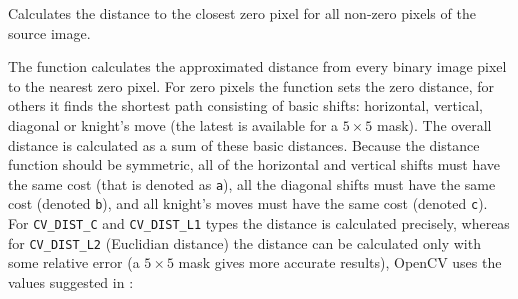 Calculates the distance to the closest zero pixel for all non-zero pixels of the source image.


\begin{description}
\end{description}

The function calculates the approximated
distance from every binary image pixel to the nearest zero pixel.
For zero pixels the function sets the zero distance, for others it
finds the shortest path consisting of basic shifts: horizontal,
vertical, diagonal or knight's move (the latest is available for a
$5\times 5$ mask). The overall distance is calculated as a sum of these
basic distances. Because the distance function should be symmetric,
all of the horizontal and vertical shifts must have the same cost (that
is denoted as \texttt{a}), all the diagonal shifts must have the
same cost (denoted \texttt{b}), and all knight's moves must have
the same cost (denoted \texttt{c}). For \texttt{CV\_DIST\_C} and
\texttt{CV\_DIST\_L1} types the distance is calculated precisely,
whereas for \texttt{CV\_DIST\_L2} (Euclidian distance) the distance
can be calculated only with some relative error (a $5\times 5$ mask
gives more accurate results), OpenCV uses the values suggested in
\cite{Borgefors86}:


